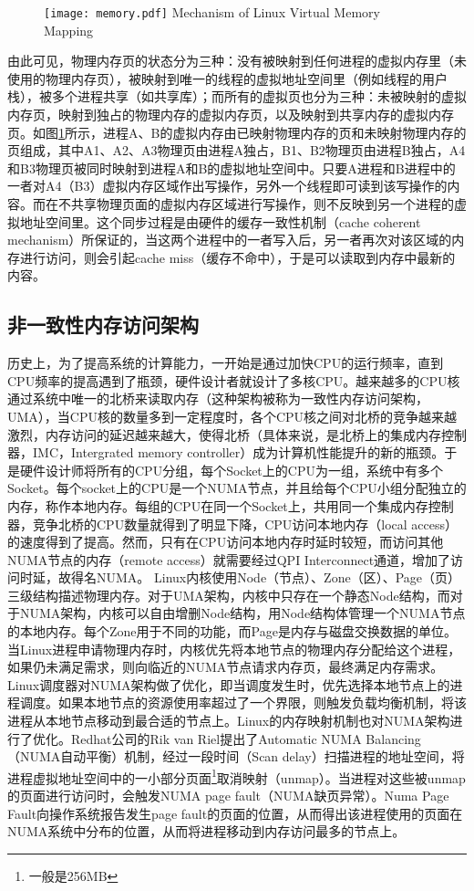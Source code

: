 \begin{figure}[!htp]
  \centering
  \texttt{[image: memory.pdf]}
    {Mechanism of Linux Virtual Memory Mapping}
  \label{fig:MEM}
\end{figure}
由此可见，物理内存页的状态分为三种：没有被映射到任何进程的虚拟内存里（未使用的物理内存页），被映射到唯一的线程的虚拟地址空间里（例如线程的用户栈），被多个进程共享（如共享库）；而所有的虚拟页也分为三种：未被映射的虚拟内存页，映射到独占的物理内存的虚拟内存页，以及映射到共享内存的虚拟内存页。如图\ref{fig:MEM}所示，进程A、B的虚拟内存由已映射物理内存的页和未映射物理内存的页组成，其中A1、A2、A3物理页由进程A独占，B1、B2物理页由进程B独占，A4和B3物理页被同时映射到进程A和B的虚拟地址空间中。只要A进程和B进程中的一者对A4（B3）虚拟内存区域作出写操作，另外一个线程即可读到该写操作的内容。而在不共享物理页面的虚拟内存区域进行写操作，则不反映到另一个进程的虚拟地址空间里。这个同步过程是由硬件的缓存一致性机制（cache coherent mechanism）所保证的，当这两个进程中的一者写入后，另一者再次对该区域的内存进行访问，则会引起cache miss（缓存不命中），于是可以读取到内存中最新的内容。

\subsection{非一致性内存访问架构}
历史上，为了提高系统的计算能力，一开始是通过加快CPU的运行频率，直到CPU频率的提高遇到了瓶颈，硬件设计者就设计了多核CPU。越来越多的CPU核通过系统中唯一的北桥来读取内存（这种架构被称为一致性内存访问架构，UMA），当CPU核的数量多到一定程度时，各个CPU核之间对北桥的竞争越来越激烈，内存访问的延迟越来越大，使得北桥（具体来说，是北桥上的集成内存控制器，IMC，Intergrated memory controller）成为计算机性能提升的新的瓶颈。于是硬件设计师将所有的CPU分组，每个Socket上的CPU为一组，系统中有多个Socket。每个socket上的CPU是一个NUMA节点，并且给每个CPU小组分配独立的内存，称作本地内存。每组的CPU在同一个Socket上，共用同一个集成内存控制器，竞争北桥的CPU数量就得到了明显下降，CPU访问本地内存（local access）的速度得到了提高。然而，只有在CPU访问本地内存时延时较短，而访问其他NUMA节点的内存（remote access）就需要经过QPI Interconnect通道，增加了访问时延，故得名NUMA。
\label{chap:memm}
Linux内核使用Node（节点）、Zone（区）、Page（页）三级结构描述物理内存\cite{phymem}。对于UMA架构，内核中只存在一个静态Node结构，而对于NUMA架构，内核可以自由增删Node结构，用Node结构体管理一个NUMA节点的本地内存。每个Zone用于不同的功能，而Page是内存与磁盘交换数据的单位。当Linux进程申请物理内存时，内核优先将本地节点的物理内存分配给这个进程，如果仍未满足需求，则向临近的NUMA节点请求内存页，最终满足内存需求。Linux调度器对NUMA架构做了优化，即当调度发生时，优先选择本地节点上的进程调度。如果本地节点的资源使用率超过了一个界限，则触发负载均衡机制，将该进程从本地节点移动到最合适的节点上。Linux的内存映射机制也对NUMA架构进行了优化。Redhat公司的Rik van Riel提出了Automatic NUMA Balancing（NUMA自动平衡）机制\cite{balancing}，经过一段时间（Scan delay）扫描进程的地址空间，将进程虚拟地址空间中的一小部分页面\footnote{一般是256MB}取消映射（unmap）。当进程对这些被unmap的页面进行访问时，会触发NUMA page fault（NUMA缺页异常）。Numa Page Fault向操作系统报告发生page fault的页面的位置，从而得出该进程使用的页面在NUMA系统中分布的位置，从而将进程移动到内存访问最多的节点上。

